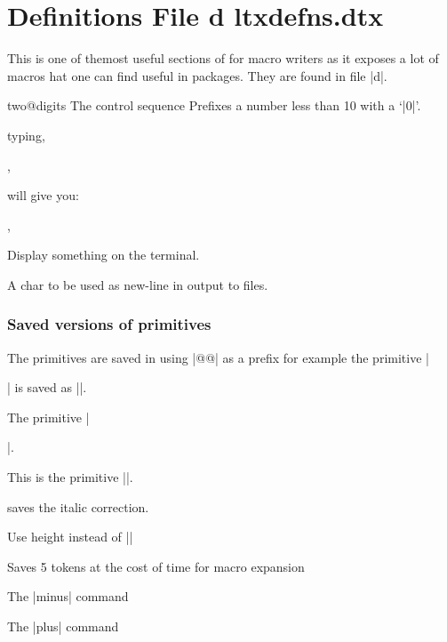 \chapter{Definitions File d ltxdefns.dtx}
\label{ch:ltxdefns}
This is one of themost useful sections of \latex for macro writers as it exposes a lot of macros hat one can find useful in packages. They are found in file |d|.

\begin{docCommand} { two@digits} { }
The control sequence\cmd{\two@digits} Prefixes a number less than 10 with a `|0|'.
\end{docCommand}
typing,
\begin{teX}
,
\end{teX}

will give you:

\makeatletter
{},
\makeatother


 Display something on the terminal.

\begin{teX}
 \def\typeout#1{\begingroup\set@display@protect
 \immediate\write\@unused{#1}\endgroup}
\end{teX}

 A char to be used as new-line in output to files.



\subsection{Saved versions of primitives}

The \tex primitives are saved in \latex using |@@| as a prefix for example the \tex primitive |\par| is saved as |\@@par|.

\begin{trivlist}

\item {} The \tex primitive |\par|.

\item {} This is the \tex primitive |\-|.

\item {} saves the italic correction.

\item {} Use height instead of |\height|

\item  {}

\item  {} Saves 5 tokens at the cost of time for macro expansion

\item {} The |minus| command

\item  {} The |plus| command
\end{trivlist}


